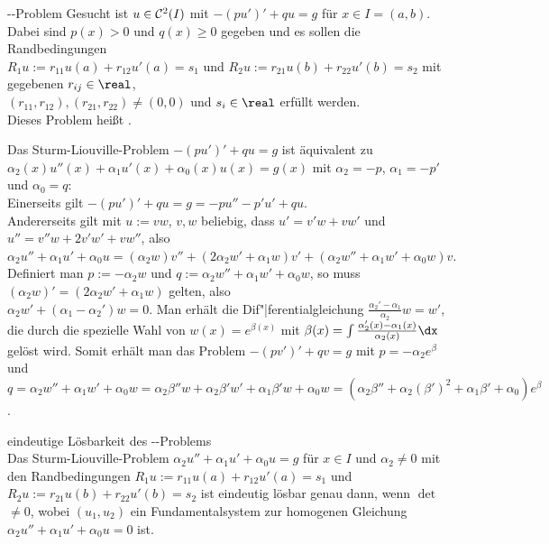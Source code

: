 \linie
\pagebreak

\begin{Def}{--Problem}
    Gesucht ist $u \in \mathcal{C}^2(I)$ mit $-(pu')' + qu = g$ für $x \in I = (a, b)$.
    Dabei sind $p(x) > 0$ und $q(x) \ge 0$ gegeben und es sollen die
    Randbedingungen\\
    $R_1 u := r_{11} u(a) + r_{12} u'(a) = s_1$ und
    $R_2 u := r_{21} u(b) + r_{22} u'(b) = s_2$ mit
    gegebenen $r_{ij} \in \real$,\\
    $(r_{11}, r_{12}), (r_{21}, r_{22}) \not= (0, 0)$ und
    $s_i \in \real$ erfüllt werden.\\
    Dieses Problem heißt .
\end{Def}

\begin{Bem}
    Das Sturm-Liouville-Problem $-(pu')' + qu = g$ ist äquivalent zu\\
    $\alpha_2(x) u''(x) + \alpha_1 u'(x) + \alpha_0(x) u(x) = g(x)$ mit
    $\alpha_2 = -p$, $\alpha_1 = -p'$ und $\alpha_0 = q$:\\
    Einerseits gilt $-(pu')' + qu = g = -pu'' - p'u' + qu$.\\
    Andererseits gilt mit $u := vw$, $v, w$ beliebig, dass
    $u' = v'w + vw'$ und
    $u'' = v''w + 2v'w' + vw''$, also
    $\alpha_2 u'' + \alpha_1 u' + \alpha_0 u =
    (\alpha_2 w) v'' + (2 \alpha_2 w' + \alpha_1 w) v' +
    (\alpha_2 w'' + \alpha_1 w' + \alpha_0 w) v$.
    Definiert man $p := -\alpha_2 w$ und
    $q := \alpha_2 w'' + \alpha_1 w' + \alpha_0 w$, so muss
    $(\alpha_2 w)' = (2 \alpha_2 w' + \alpha_1 w)$ gelten, also\\
    $\alpha_2 w' + (\alpha_1 - \alpha_2') w = 0$.
    Man erhält die Dif"|ferentialgleichung
    $\frac{\alpha_2' - \alpha_1}{\alpha_2} w = w'$, die durch die spezielle
    Wahl von $w(x) = e^{\beta(x)}$ mit
    $\beta(x) = \int \frac{\alpha_2'(x) - \alpha_1(x)}{\alpha_2(x)} \dx$
    gelöst wird.
    Somit erhält man das Problem
    $-(pv')' + qv = g$ mit
    $p = -\alpha_2 e^\beta$ und\\
    $q = \alpha_2 w'' + \alpha_1 w' + \alpha_0 w =
    \alpha_2 \beta'' w + \alpha_2 \beta' w' + \alpha_1 \beta' w + \alpha_0 w =
    (\alpha_2 \beta'' + \alpha_2 (\beta')^2 + \alpha_1 \beta' + \alpha_0)
    e^\beta$.
\end{Bem}

\begin{Satz}{eindeutige Lösbarkeit des --Problems}\\
    Das Sturm-Liouville-Problem $\alpha_2 u'' + \alpha_1 u' + \alpha_0 u = g$
    für $x \in I$ und $\alpha_2 \not= 0$ mit den Randbedingungen
    $R_1 u := r_{11} u(a) + r_{12} u'(a) = s_1$ und
    $R_2 u := r_{21} u(b) + r_{22} u'(b) = s_2$
    ist eindeutig lösbar genau dann, wenn
    $\det$ $\not= 0$, wobei
    $(u_1, u_2)$ ein Fundamentalsystem zur homogenen Gleichung
    $\alpha_2 u'' + \alpha_1 u' + \alpha_0 u = 0$ ist.
\end{Satz}

